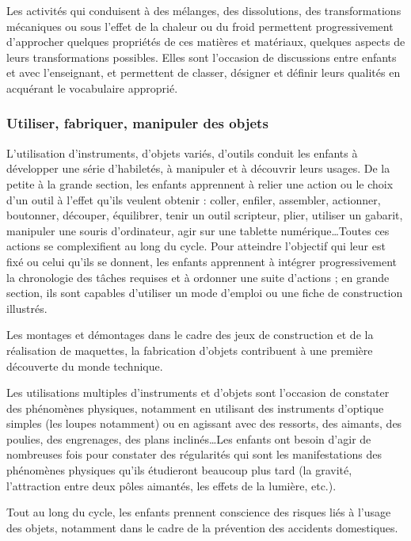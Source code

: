 Les activités qui conduisent à des mélanges, des dissolutions, des transformations mécaniques ou sous l’effet de la chaleur ou du froid permettent progressivement d’approcher quelques propriétés de ces matières et matériaux, quelques aspects de leurs transformations possibles. Elles sont l’occasion de discussions entre enfants et avec l’enseignant, et permettent de classer, désigner et définir leurs qualités en acquérant le vocabulaire approprié. 

\subsubsection{Utiliser, fabriquer, manipuler des objets}
L'utilisation d'instruments, d’objets variés, d’outils conduit les enfants à développer une série d’habiletés, à manipuler et à découvrir leurs usages. De la petite à la grande section, les enfants apprennent à relier une action ou le choix d’un outil à l’effet qu’ils veulent obtenir : coller, enfiler, assembler, actionner, boutonner, découper, équilibrer, tenir un outil scripteur, plier, utiliser un gabarit, manipuler une souris d’ordinateur, agir sur une tablette numérique\dots Toutes ces actions se complexifient au long du cycle. Pour atteindre l’objectif qui leur est fixé ou celui qu’ils se donnent, les enfants apprennent à intégrer progressivement la chronologie des tâches requises et à ordonner une suite d’actions ; en grande section, ils sont capables d’utiliser un mode d’emploi ou une fiche de construction illustrés.

Les montages et démontages dans le cadre des jeux de construction et de la réalisation de maquettes, la fabrication d'objets contribuent à une première découverte du monde technique. 

Les utilisations multiples d’instruments et d’objets sont l’occasion de constater des phénomènes physiques, notamment en utilisant des instruments d’optique simples (les loupes notamment) ou en agissant avec des ressorts, des aimants, des poulies, des engrenages, des plans inclinés\dots Les enfants ont besoin d’agir de nombreuses fois pour constater des régularités qui sont les manifestations des phénomènes physiques qu’ils étudieront beaucoup plus tard (la gravité, l’attraction entre deux pôles aimantés, les effets de la lumière, etc.).

Tout au long du cycle, les enfants prennent conscience des risques liés à l’usage des objets, notamment dans le cadre de la prévention des accidents domestiques.

